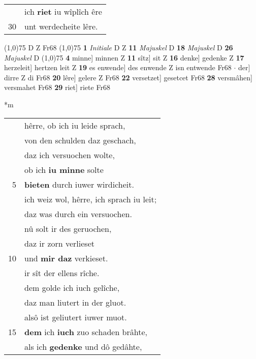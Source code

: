 \documentclass[8pt,a4paper,notitlepage]{article}
\begin{document}
\begin{table}[ht]
\begin{minipage}[t]{0.5\linewidth}
\begin{tabular}{rl}
 & ich \textbf{riet} iu wîplîch êre\\ 
30 & unt werdecheite lêre.\\ 
\end{tabular}
\scriptsize
\line(1,0){75} \newline
D Z Fr68 \newline
\line(1,0){75} \newline
\textbf{1} \textit{Initiale} D Z  \textbf{11} \textit{Majuskel} D  \textbf{18} \textit{Majuskel} D  \textbf{26} \textit{Majuskel} D  \newline
\line(1,0){75} \newline
\textbf{4} minne] minnen Z \textbf{11} sîtz] sit Z \textbf{16} denke] gedenke Z \textbf{17} herzeleit] hertzen leit Z \textbf{19} es enwende] des enwende Z isn entwende Fr68  $\cdot$ der] dirre Z di Fr68 \textbf{20} lêre] gelere Z Fr68 \textbf{22} versetzet] gesetcet Fr68 \textbf{28} versmâhen] versmahet Fr68 \textbf{29} riet] riete Fr68 \newline
\end{minipage}
\hspace{0.5cm}
\begin{minipage}[t]{0.5\linewidth}
\small
\begin{center}*m
\end{center}
\begin{tabular}{rl}
 & hêrre, ob ich iu leide sprach,\\ 
 & von den schulden daz geschach,\\ 
 & daz ich versuochen wolte,\\ 
 & ob ich \textbf{iu minne} solte\\ 
5 & \textbf{bieten} durch iuwer wirdicheit.\\ 
 & ich weiz wol, hêrre, ich sprach iu leit;\\ 
 & daz was durch ein versuochen.\\ 
 & nû solt ir des geruochen,\\ 
 & daz ir zorn verlieset\\ 
10 & und \textbf{mir daz} verkieset.\\ 
 & ir sît der ellens rîche.\\ 
 & dem golde ich iuch gelîche,\\ 
 & daz man liutert in der gluot.\\ 
 & alsô ist geliutert iuwer muot.\\ 
15 & \textbf{dem} ich \textbf{iuch} zuo schaden brâhte,\\ 
 & als ich \textbf{gedenke} und dô gedâhte,\\ 

\end{tabular}
\end{minipage}
\end{table}
\end{document}
